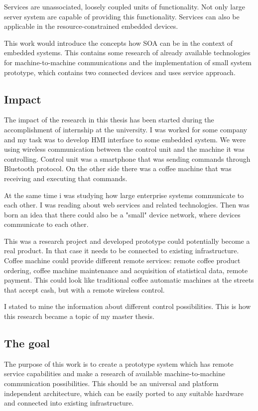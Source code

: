 Services are unassociated, loosely coupled units of functionality.
Not only large server system are capable of providing this functionality.
Services can also be applicable in the resource-constrained embedded devices.

This work would introduce the concepts how \gls{SOA} can be in the  context  of 
embedded  systems.
This contains some research of already available technologies for
machine-to-machine communications and the implementation of small system
prototype, which contains two connected devices and uses service approach.

\subsection{Impact}
The impact of the research in this thesis has been started during the accomplishment of internship at the university. 
I was worked for some company and my task was to develop \gls{HMI} interface to some embedded system.
We were using wireless communication between the control unit and the machine it was controlling.
Control unit was a smartphone that was sending commands through Bluetooth protocol.
On the other side there was a coffee machine that was receiving and executing that commands.

At the same time i was studying how large enterprise systems communicate to each other.
I was reading about web services and related technologies.
Then was born an idea that there could also be a "small" device network, where
devices communicate to each other.

This was a research project and developed prototype could potentially become a real product.
In that case it needs to be connected to existing infrastructure.
Coffee machine could provide different remote services: remote coffee product
ordering, coffee machine maintenance and acquisition of statistical data, remote
payment.
This could look like traditional coffee automatic machines at the streets that
accept cash, but with a remote wireless control.

I stated to mine the information about different control possibilities.
This is how this research became a topic of my master thesis. 

\subsection{The goal}

The purpose of this work is to create a prototype system which has remote
service capabilities and make a research of available machine-to-machine
communication possibilities.
This should be an universal and platform independent architecture, which can be easily ported to any suitable hardware and connected
into existing infrastructure. 

